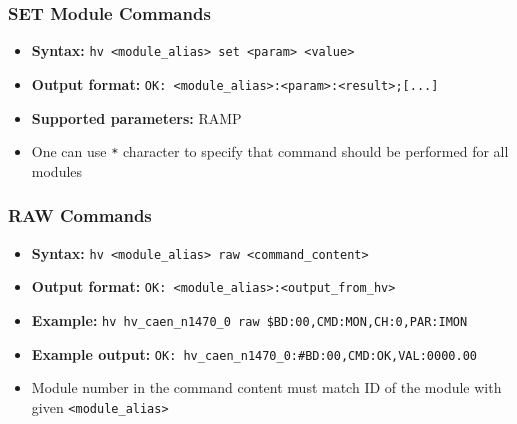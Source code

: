 \dotfill

\subsubsection*{SET Module Commands}
\begin{itemize}
    \item \textbf{Syntax:} \lstinline{hv <module_alias> set <param> <value>}
    \item \textbf{Output format:} \lstinline{OK: <module_alias>:<param>:<result>;[...]}
    \item \textbf{Supported parameters:} RAMP
    \item One can use \lstinline{*} character to specify that command should be performed for all modules
\end{itemize}

\dotfill

\subsubsection*{RAW Commands}
\begin{itemize}
    \item \textbf{Syntax:} \lstinline{hv <module_alias> raw <command_content>}
    \item \textbf{Output format:} \lstinline{OK: <module_alias>:<output_from_hv>}
    \item \textbf{Example:} \lstinline{hv hv_caen_n1470_0 raw $BD:00,CMD:MON,CH:0,PAR:IMON}
    \item \textbf{Example output:} \lstinline{OK: hv_caen_n1470_0:#BD:00,CMD:OK,VAL:0000.00}
    \item Module number in the command content must match ID of the module with given \lstinline{<module_alias>}
\end{itemize}
